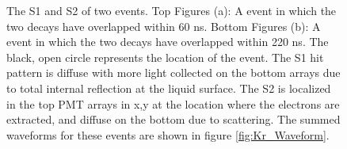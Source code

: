 \renewcommand{\baselinestretch}{1}
\small\normalsize
\begin{figure}[h!]\centering
 

\caption{The S1 and S2 of two \KrCal events. Top Figures (a): A \KrCal event in which the two decays have overlapped within 60 ns. Bottom Figures (b): A \KrCal event in which the two decays have overlapped within 220 ns. The black, open circle represents the location of the event. The S1 hit pattern is diffuse with more light collected on the bottom arrays due to total internal reflection at the liquid surface. The S2 is localized in the top PMT arrays in x,y at the location where the electrons are extracted, and diffuse on the bottom due to scattering. The summed waveforms for these events are shown in figure \ref{fig:Kr_Waveform}.}
\label{fig:Kr_Hit_Map}
\end{figure}
\renewcommand{\baselinestretch}{2}
\small\normalsize

